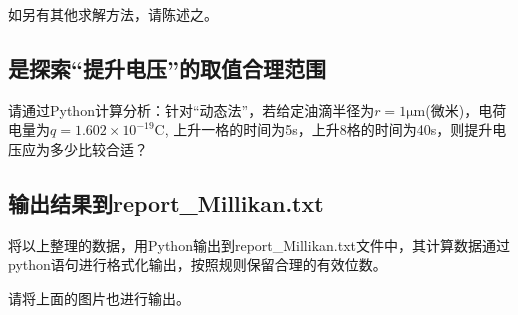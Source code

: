 如另有其他求解方法，请陈述之。

\subsection{是探索“提升电压”的取值合理范围}

请通过Python计算分析：针对“动态法”，若给定油滴半径为$r=1 \mathrm{\mu m}$(微米)，电荷电量为$q=1.602\times 10^{-19}$C, 上升一格的时间为5s，上升8格的时间为40s，则提升电压应为多少比较合适？

\subsection{输出结果到report_Millikan.txt}
将以上整理的数据，用Python输出到report\_Millikan.txt文件中，其计算数据通过python语句进行格式化输出，按照规则保留合理的有效位数。

请将上面的图片也进行输出。